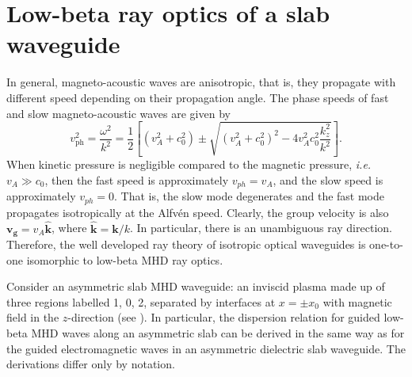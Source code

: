 \documentclass[12pt]{../style-files/ociamthesis}
\begin{document}
	
	\section{Low-beta ray optics of a slab waveguide}
	\label{sec: low beta}
	
	In general, magneto-acoustic waves are anisotropic, that is, they propagate with different speed depending on their propagation angle. The phase speeds of fast and slow magneto-acoustic waves are given by
	\begin{equation}
	v_\mathrm{ph}^2 = \frac{\omega^2}{k^2} = \frac{1}{2}\left[ (v_A^2 + c_0^2) \pm \sqrt{(v_A^2 + c_0^2)^2 - 4v_A^2c_0^2\frac{k_z^2}{k^2}} \right]. \label{MHD DR}
	\end{equation}
	When kinetic pressure is negligible compared to the magnetic pressure, \textit{i.e.} $v_A \gg c_0$, then the fast speed is approximately $v_{ph} = v_A$, and the slow speed is approximately $v_{ph} = 0$. That is, the slow mode degenerates and the fast mode propagates isotropically at the Alfv\'{e}n speed. Clearly, the group velocity is also $\mathbf{v_g} = v_A \mathbf{\hat{k}}$, where $\mathbf{\hat{k}} = \mathbf{k}/k$. In particular, there is an unambiguous ray direction. Therefore, the well developed ray theory of isotropic optical waveguides is one-to-one isomorphic to low-beta MHD ray optics.
	
	Consider an asymmetric slab MHD waveguide: an inviscid plasma made up of three regions labelled 1, 0, 2, separated by interfaces at $x = \pm x_0$ with magnetic field in the $z$-direction (see \citep{all_etal17}). In particular, the dispersion relation for guided low-beta MHD waves along an asymmetric slab can be derived in the same way as for the guided electromagnetic waves in an asymmetric dielectric slab waveguide. The derivations differ only by notation.
	
\end{document}
